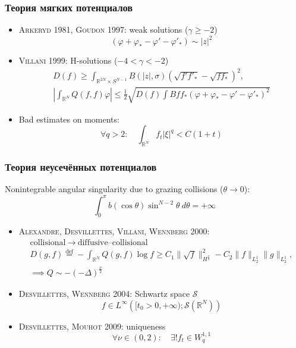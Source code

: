 \documentclass[mathserif]{beamer} %
\newcommand{\eqdef}{\overset{\mathrm{def}}{=}}
\newcommand{\dd}{\:d}%
\newcommand{\Cite}[2][]{\alert{\textsc{#2 #1}}}
\renewcommand{\phi}{\varphi}
\begin{document}
\begin{frame}
    \frametitle{Теория мягких потенциалов}
    \begin{itemize}
        \item \Cite[1981]{Arkeryd}, \Cite[1997]{Goudon}: weak solutions (\(\gamma\geq-2\))
        \[ (\phi + \phi_* - \phi' - \phi'_*) \sim |z|^2 \]
        \item \Cite[1999]{Villani}: H-solutions (\(-4<\gamma<-2\))
        \begin{gather*}
            D(f) \geq \int_{\mathbb{R}^{2N}\times S^{N-1}} B(|z|, \sigma) \left(\sqrt{f'f'_*} - \sqrt{ff_*}\right)^2, \\
            \left| \int_{\mathbb{R}^N} Q(f,f)\phi \right| \leq \frac12
            \sqrt{ D(f) \int Bff_* (\phi + \phi_* - \phi' - \phi'_*)^2 }
        \end{gather*}
        \item Bad estimates on moments:
        \[ \forall q>2: \quad\int_{\mathbb{R}^N} f_t |\xi|^q < C(1+t) \]
    \end{itemize}
\end{frame}

\begin{frame}
    \frametitle{Теория неусечённых потенциалов}
    Nonintegrable angular singularity due to grazing collisions (\(\theta\to0\)):
    \[ \int_0^\pi b(\cos\theta)\sin^{N-2}\theta\dd\theta = +\infty \]
    \vspace{-20pt}
    \begin{itemize}
        \item \Cite[2000]{Alexandre, Desvillettes, Villani, Wennberg}:
        \begin{gather*}
            \text{collisional} \:\longrightarrow\: \text{diffusive--collisional} \\
            D(g,f) \eqdef -\int_{\mathbb{R}^N} Q(g,f)\log{f} \geq C_1\|\sqrt{f}\|^2_{H^\frac\nu2} - C_2\|f\|_{L^1_2}\|g\|_{L^1_2}, \\
            \implies Q \sim -(-\Delta)^\frac\nu2 %
        \end{gather*}
        \item \Cite[2004]{Desvillettes, Wennberg}: Schwartz space \(\mathscr{S}\)
        \[ f \in L^\infty\left([t_0>0,+\infty); \mathscr{S}(\mathbb{R}^N)\right) \]
        \item \Cite[2009]{Desvillettes, Mouhot}: uniqueness
        \[ \forall\nu\in(0,2): \quad\exists! f_t\in W_q^{1,1} \]
    \end{itemize}
\end{frame}
\end{document}
